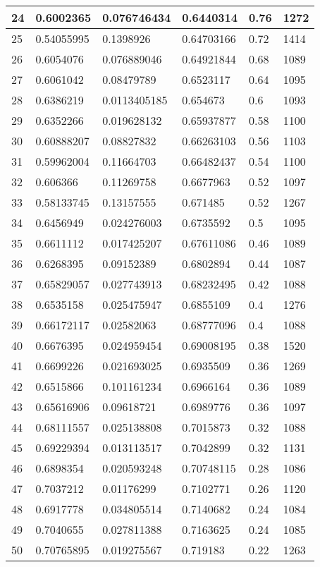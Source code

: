 \begin{longtable}{|l|l|l|l|l|l|}
24 & 0.6002365 & 0.076746434 & 0.6440314 & 0.76 & 1272 \\ \hline 
25 & 0.54055995 & 0.1398926 & 0.64703166 & 0.72 & 1414 \\ \hline 
26 & 0.6054076 & 0.076889046 & 0.64921844 & 0.68 & 1089 \\ \hline 
27 & 0.6061042 & 0.08479789 & 0.6523117 & 0.64 & 1095 \\ \hline 
28 & 0.6386219 & 0.0113405185 & 0.654673 & 0.6 & 1093 \\ \hline 
29 & 0.6352266 & 0.019628132 & 0.65937877 & 0.58 & 1100 \\ \hline 
30 & 0.60888207 & 0.08827832 & 0.66263103 & 0.56 & 1103 \\ \hline 
31 & 0.59962004 & 0.11664703 & 0.66482437 & 0.54 & 1100 \\ \hline 
32 & 0.606366 & 0.11269758 & 0.6677963 & 0.52 & 1097 \\ \hline 
33 & 0.58133745 & 0.13157555 & 0.671485 & 0.52 & 1267 \\ \hline 
34 & 0.6456949 & 0.024276003 & 0.6735592 & 0.5 & 1095 \\ \hline 
35 & 0.6611112 & 0.017425207 & 0.67611086 & 0.46 & 1089 \\ \hline 
36 & 0.6268395 & 0.09152389 & 0.6802894 & 0.44 & 1087 \\ \hline 
37 & 0.65829057 & 0.027743913 & 0.68232495 & 0.42 & 1088 \\ \hline 
38 & 0.6535158 & 0.025475947 & 0.6855109 & 0.4 & 1276 \\ \hline 
39 & 0.66172117 & 0.02582063 & 0.68777096 & 0.4 & 1088 \\ \hline 
40 & 0.6676395 & 0.024959454 & 0.69008195 & 0.38 & 1520 \\ \hline 
41 & 0.6699226 & 0.021693025 & 0.6935509 & 0.36 & 1269 \\ \hline 
42 & 0.6515866 & 0.101161234 & 0.6966164 & 0.36 & 1089 \\ \hline 
43 & 0.65616906 & 0.09618721 & 0.6989776 & 0.36 & 1097 \\ \hline 
44 & 0.68111557 & 0.025138808 & 0.7015873 & 0.32 & 1088 \\ \hline 
45 & 0.69229394 & 0.013113517 & 0.7042899 & 0.32 & 1131 \\ \hline 
46 & 0.6898354 & 0.020593248 & 0.70748115 & 0.28 & 1086 \\ \hline 
47 & 0.7037212 & 0.01176299 & 0.7102771 & 0.26 & 1120 \\ \hline 
48 & 0.6917778 & 0.034805514 & 0.7140682 & 0.24 & 1084 \\ \hline 
49 & 0.7040655 & 0.027811388 & 0.7163625 & 0.24 & 1085 \\ \hline 
50 & 0.70765895 & 0.019275567 & 0.719183 & 0.22 & 1263 \\ \hline 
\end{longtable}